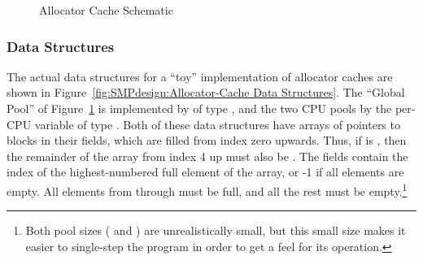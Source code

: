 \begin{figure}[htb]
\begin{center}
\end{center}
\caption{Allocator Cache Schematic}
\label{fig:SMPdesign:Allocator Cache Schematic}
\end{figure}

\subsubsection{Data Structures}

The actual data structures for a ``toy'' implementation of allocator
caches are shown in
Figure~\ref{fig:SMPdesign:Allocator-Cache Data Structures}.
The ``Global Pool'' of Figure~\ref{fig:SMPdesign:Allocator Cache Schematic}
is implemented by  of type ,
and the two CPU pools by the per-CPU variable  of
type .
Both of these data structures have arrays of pointers to blocks
in their  fields, which are filled from index zero upwards.
Thus, if  is , then the remainder of
the array from index 4 up must also be .
The  fields contain the index of the highest-numbered full
element of the  array, or -1 if all elements are empty.
All elements from  through
 must be full, and all the rest
must be empty.\footnote{
	Both pool sizes ( and
	) are unrealistically small, but this small
	size makes it easier to single-step the program in order to get
	a feel for its operation.}

